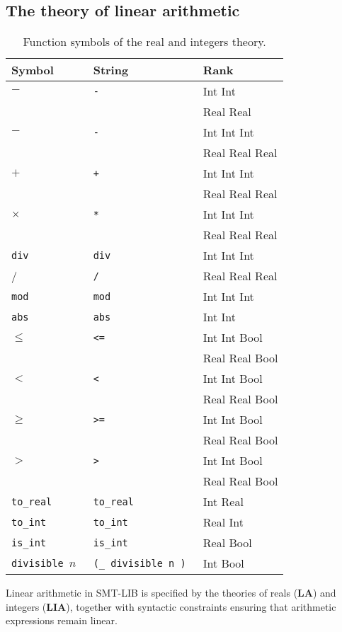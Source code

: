 \subsection{The theory of linear arithmetic}
\label{ssec:smt-la}

\begin{table}
\centering
\begin{tabular}{lll}
\toprule
\textbf{Symbol} & \textbf{String} & \textbf{Rank} \\
\midrule
$-$ & \tt{-} & Int Int \\
    &            & Real Real \\
$-$ & \tt{-} & Int Int Int \\
    &            & Real Real Real \\
$+$ & \tt{+} & Int Int Int \\
    &            & Real Real Real \\
$\times$ & \tt{*} & Int Int Int \\
    &               & Real Real Real \\
\tt{div} & \tt{div} & Int Int Int \\
/ & \tt{/} & Real Real Real \\
\tt{mod} & \tt{mod} & Int Int Int \\
\tt{abs} & \tt{abs} & Int Int \\
$\leq$ & \tt{<=} & Int Int Bool \\
    &                & Real Real Bool \\
$<$ & \tt{<} & Int Int Bool \\
    &             & Real Real Bool \\
$\geq$ & \tt{>=} & Int Int Bool \\
    &               & Real Real Bool \\
$>$ & \tt{>} & Int Int Bool \\
    &             & Real Real Bool \\
\tt{to\_real} & \tt{to\_real} & Int Real \\
\tt{to\_int}  & \tt{to\_int} & Real Int \\
\tt{is\_int}  & \tt{is\_int} & Real Bool \\
\tt{divisible} $n$ & \tt{(\_ divisible n )} & Int Bool \\
\bottomrule
\end{tabular}
\caption{Function symbols of the real and integers theory.}
\label{tab:real-int-funs}
\end{table}

Linear arithmetic in SMT-LIB is specified by the theories of reals (\textbf{LA}) and integers (\textbf{LIA}), together with syntactic constraints ensuring that arithmetic expressions remain linear.

